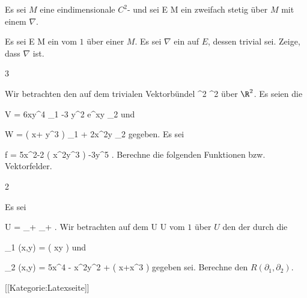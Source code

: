 {}
{

Es sei $M$ eine eindimensionale
$C^2$-
und sei
\maabb {} { E } { M
} {}
ein zweifach stetig
über $M$ mit einem
$\nabla$.

}
{} {}

{}
{

Es sei
\maabb {} { E } { M
} {}
ein
vom
$1$ über einer
$M$. Es sei $\nabla$ ein
auf $E$, dessen
trivial sei. Zeige, dass $\nabla$
ist.

}
{} {}


{3}
{

Wir betrachten den
auf dem trivialen Vektorbündel
\maabbdisp {} {\R^2 \times \R } { \R^2
} {}
über $\R^2$. Es seien die

\mavergleichskettedisp
{\vergleichskette
{ V
}
{ =} { 6xy^4 \partial_1 -3 y^2 e^{xy} \partial_2
}
{ } {
}
{ } {
}
{ } {
}
}
{}{}{}
und

\mavergleichskettedisp
{\vergleichskette
{ W
}
{ =} { \left(  x+ y^3  \right)  \partial_1 + 2x^2y \partial_2
}
{ } {
}
{ } {
}
{ } {
}
}
{}{}{}
gegeben. Es sei

\mavergleichskettedisp
{\vergleichskette
{ f
}
{ =} { 5x^2-2  \cos \left(  x^2y^3 \right) -3y^5
}
{ } {
}
{ } {
}
{ } {
}
}
{}{}{.}
Berechne die folgenden Funktionen bzw. Vektorfelder.

}
{} {}

{2}
{

Es sei

\mavergleichskette
{\vergleichskette
{ U
}
{ = }{ \R_+ \times \R_+
}
{  }{
}
{    }{
}
{   }{
}
}
{}{}{.}
Wir betrachten auf dem
 {U \times \R} { U
} {}
vom
$1$ über $U$ den
der durch die

\mavergleichskette
{\vergleichskette
{ \Gamma_1 (x,y)
}
{ = }{ \ln  \left(  xy \right)
}
{  }{
}
{    }{
}
{   }{
}
}
{}{}{}
und

\mavergleichskette
{\vergleichskette
{ \Gamma_2 (x,y)
}
{ = }{ 5x^4 - \cos  x^2y^2 +  \ln  \left(  x+x^3 \right)
}
{  }{
}
{    }{
}
{   }{
}
}
{}{}{}
gegeben sei. Berechne den
$R \left(  \partial_1, \partial_2  \right)$.

}
{} {}

 [[Kategorie:Latexseite]]
